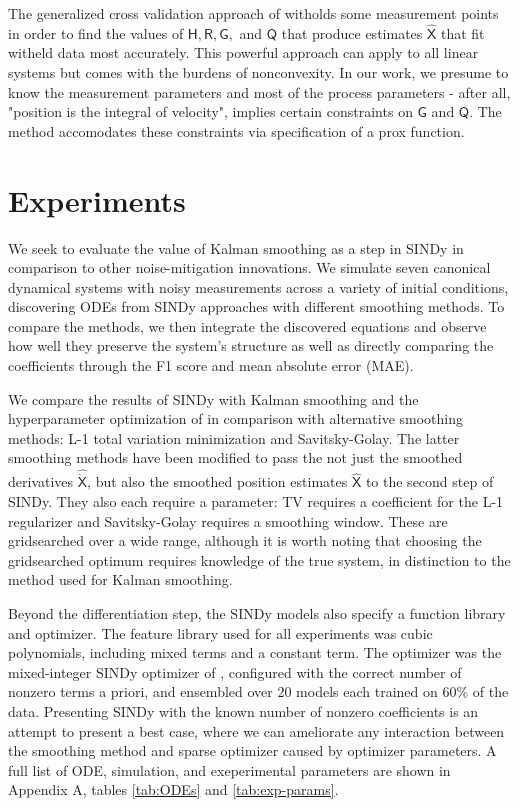 \documentclass{article}
\newcommand{\mat}[1]{\boldsymbol{\mathsf{#1}}}
\begin{document}
The generalized cross validation approach of \cite{Barratt2020} witholds some measurement points in order to find the values of $\mat H, \mat R, \mat G,$ and $\mat Q$ that produce estimates $\hat{\mat X}$ that fit witheld data most accurately.  This powerful approach can apply to all linear systems but comes with the burdens of nonconvexity.  In our work, we presume to know the measurement parameters and most of the process parameters - after all, "position is the integral of velocity", implies certain constraints on $\mat G$ and $\mat Q$.  The method accomodates these constraints via specification of a prox function.

\section{Experiments}

We seek to evaluate the value of Kalman smoothing as a step in SINDy in comparison to other noise-mitigation innovations.  We simulate seven canonical dynamical systems with noisy measurements across a variety of initial conditions, discovering ODEs from SINDy approaches with different smoothing methods.  To compare the methods, we then integrate the discovered equations and observe how well they preserve the system's structure as well as directly comparing the coefficients through the F1 score and mean absolute error (MAE).

We compare the results of SINDy with Kalman smoothing and the hyperparameter optimization of \cite{Barratt2020} in comparison with alternative smoothing methods: L-1 total variation minimization and Savitsky-Golay.  The latter smoothing methods have been modified to pass the not just the smoothed derivatives $\mat{\widehat{\dot X}}$, but also the smoothed position estimates $\mat {\widehat X}$ to the second step of SINDy.  They also each require a parameter: TV requires a coefficient for the L-1 regularizer and Savitsky-Golay requires a smoothing window.  These are gridsearched over a wide range, although it is worth noting that choosing the gridsearched optimum requires knowledge of the true system, in distinction to the method used for Kalman smoothing.

Beyond the differentiation step, the SINDy models also specify a function library and optimizer.  The feature library used for all experiments was cubic polynomials, including mixed terms and a constant term.  The optimizer was the mixed-integer SINDy optimizer of \cite{Bertsimas2023}, configured with the correct number of nonzero terms a priori, and ensembled over 20 models each trained on 60\% of the data.  Presenting SINDy with the known number of nonzero coefficients is an attempt to present a best case, where we can ameliorate any interaction between the smoothing method and sparse optimizer caused by optimizer parameters.  A full list of ODE, simulation, and exeperimental parameters are shown in Appendix A, tables \ref{tab:ODEs} and \ref{tab:exp-params}.
\end{document}

